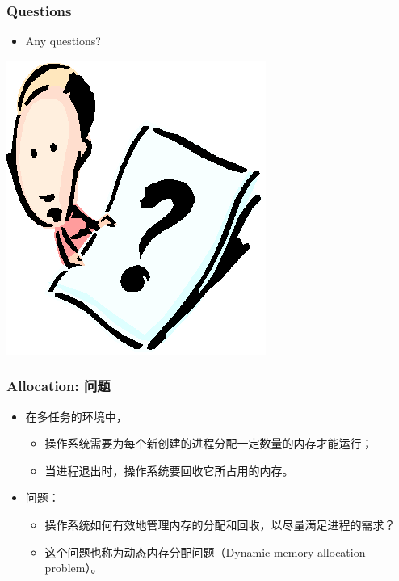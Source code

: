 \documentclass[CJKutf8,xcolor=pdftex,dvipsnames,table]{beamer}
\begin{document}
\begin{CJK*}{UTF8}{song}
  \begin{frame}
  \frametitle{Questions}
  \begin{itemize}
  \item{Any questions?}
  \end{itemize}
  \begin{center}
    \includegraphics[scale=.5]{question}
  \end{center}
  \end{frame}

  \begin{frame}
  \frametitle{Allocation: 问题} \pause
  \begin{itemize}
  \item{在多任务的环境中，} \pause
    \begin{itemize}
    \item{操作系统需要为每个新创建的进程分配一定数量的内存才能运行；} \pause
    \item{当进程退出时，操作系统要回收它所占用的内存。} \pause
    \end{itemize}
  \item{问题：} \pause
    \begin{itemize}
    \item{操作系统如何有效地管理内存的分配和回收，以尽量满足进程的需求？} \pause
    \item{这个问题也称为动态内存分配问题（Dynamic memory allocation problem）。}
    \end{itemize}
  \end{itemize}
  \end{frame}
  

\end{CJK*}
\end{document}
